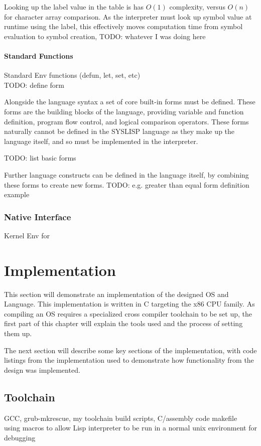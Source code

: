 \documentclass[11pt]{report}
\begin{document}
Looking up the label value in the table is has $O(1)$ complexity, versus $O(n)$ for character array comparison. As the interpreter must look up symbol value at runtime using the label, this effectively moves computation time from symbol evaluation to symbol creation,
TODO: whatever I was doing here

\subsubsection{Standard Functions}
Standard Env functions (defun, let, set, etc) \\
TODO: define form

Alongside the language syntax a set of core built-in forms must be defined. These forms are the building blocks of the language, providing variable and function definition, program flow control, and logical comparison operators. These forms naturally cannot be defined in the SYSLISP language as they make up the language itself, and so must be implemented in the interpreter.

TODO: list basic forms

Further language constructs can be defined in the language itself, by combining these forms to create new forms.
TODO: e.g. greater than equal form definition example

\subsection{Native Interface}
Kernel Env for \\

\chapter{Implementation}
This section will demonstrate an implementation of the designed OS and Language. This implementation is written in C targeting the x86 CPU family. As compiling an OS requires a specialized cross compiler toolchain to be set up, the first part of this chapter will explain the tools used and the process of setting them up.

The next section will describe some key sections of the implementation, with code listings from the implementation used to demonstrate how functionality from the design was implemented.

\section{Toolchain}
GCC, grub-mkrescue, my toolchain build scripts, C/assembly code makefile \\
using macros to allow Lisp interpreter to be run in a normal unix environment for debugging \\
\end{document}
